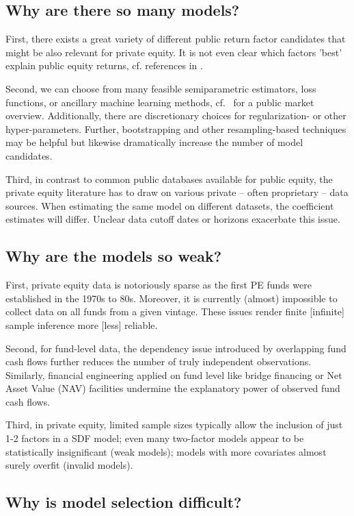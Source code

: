 \documentclass[12pt]{article}
\begin{document}
\subsection{Why are there so many models?}

First, there exists a great variety of different public return factor candidates that might be also relevant for private equity. 
It is not even clear which factors 'best' explain public equity returns, cf. references in \cite{KN20}. 

Second, we can choose from many feasible semiparametric estimators, loss functions, or ancillary machine learning methods, cf.\ \cite{GKX20} for a public market overview.
Additionally, there are discretionary choices for regularization- or other hyper-parameters.
Further, bootstrapping and other resampling-based techniques may be helpful but likewise dramatically increase the number of model candidates.

Third, in contrast to common public databases available for public equity, the private equity literature has to draw on various private -- often proprietary -- data sources. 
When estimating the same model on different datasets, the coefficient estimates will differ. 
Unclear data cutoff dates or horizons exacerbate this issue.

\subsection{Why are the models so weak?}

First, private equity data is notoriously sparse as the first PE funds were established in the 1970s to 80s.
Moreover, it is currently (almost) impossible to collect data on all funds from a given vintage. 
These issues render finite [infinite] sample inference more [less] reliable.

Second, for fund-level data, the dependency issue introduced by overlapping fund cash flows further reduces the number of truly independent observations. 
Similarly, financial engineering applied on fund level like bridge financing or Net Asset Value (NAV) facilities undermine the explanatory power of observed fund cash flows.

Third, in private equity, limited sample sizes typically allow the inclusion of just 1-2 factors in a SDF model; 
even many two-factor models appear to be statistically insignificant (weak models); 
models with more covariates almost surely overfit (invalid models).


\subsection{Why is model selection difficult?}
\end{document}
